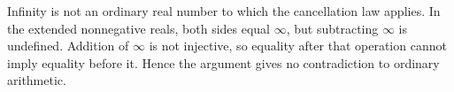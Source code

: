 Infinity is not an ordinary real number to which the cancellation law applies. In the extended nonnegative reals, both sides equal $\infty$, but subtracting $\infty$ is undefined. Addition of $\infty$ is not injective, so equality after that operation cannot imply equality before it. Hence the argument gives no contradiction to ordinary arithmetic.
